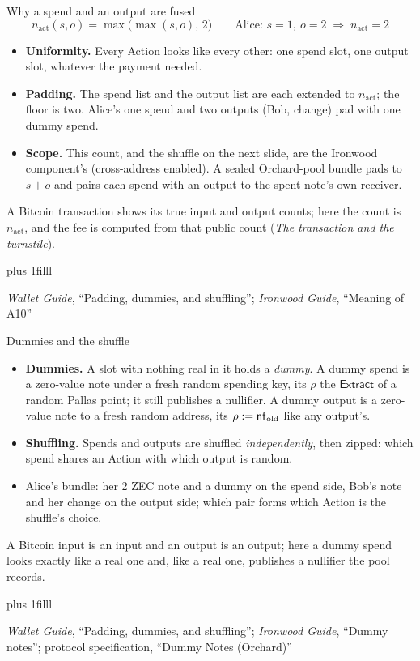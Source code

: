 \documentclass[aspectratio=169,11pt]{beamer}
\newcommand{\Extract}{\ensuremath{\mathsf{Extract}}}
\newcommand{\src}[1]{\par\vskip0pt plus 1filll
  {\fontsize{6}{7.2}\selectfont\color{arbdim}\raggedright #1\par}}
\begin{document}
\begin{frame}{Why a spend and an output are fused}
\[
n_{\mathrm{act}}(s, o) = \max\bigl(\max(s, o),\, 2\bigr)
\qquad\text{Alice: } s = 1,\ o = 2 \;\Rightarrow\; n_{\mathrm{act}} = 2
\]
\begin{itemize}
  \item \textbf{Uniformity.} Every Action looks like every other: one
    spend slot, one output slot, whatever the payment needed.
  \item \textbf{Padding.} The spend list and the output list are each
    extended to $n_{\mathrm{act}}$; the floor is two. Alice's one spend
    and two outputs (Bob, change) pad with one dummy spend.
  \item \textbf{Scope.} This count, and the shuffle on the next slide,
    are the Ironwood component's (cross-address enabled). A sealed
    Orchard-pool bundle pads to $s + o$ and pairs each spend with an
    output to the spent note's own receiver.
\end{itemize}
\medskip
\small A Bitcoin transaction shows its true input and output counts;
here the count is $n_{\mathrm{act}}$, and the fee is computed from that
public count (\emph{The transaction and the turnstile}).
\src{\emph{Wallet Guide}, ``Padding, dummies, and shuffling''; \emph{Ironwood
Guide}, ``Meaning of A10''}
\end{frame}

\begin{frame}{Dummies and the shuffle}
\begin{itemize}
  \item \textbf{Dummies.} A slot with nothing real in it holds a
    \emph{dummy}. A dummy spend is a zero-value note under a fresh
    random spending key, its $\rho$ the $\Extract$ of a random Pallas
    point; it still publishes a nullifier. A dummy output is a
    zero-value note to a fresh random address, its $\rho := \mathsf{nf}_{\mathrm{old}}$ like
    any output's.
  \item \textbf{Shuffling.} Spends and outputs are shuffled
    \emph{independently}, then zipped: which spend shares an Action
    with which output is random.
  \item Alice's bundle: her $2$ ZEC note and a dummy on the spend side,
    Bob's note and her change on the output side; which pair forms which
    Action is the shuffle's choice.
\end{itemize}
\medskip
\small A Bitcoin input is an input and an output is an output; here a
dummy spend looks exactly like a real one and, like a real one,
publishes a nullifier the pool records.
\src{\emph{Wallet Guide}, ``Padding, dummies, and shuffling''; \emph{Ironwood
Guide}, ``Dummy notes''; protocol specification, ``Dummy Notes
(Orchard)''}
\end{frame}
\end{document}
